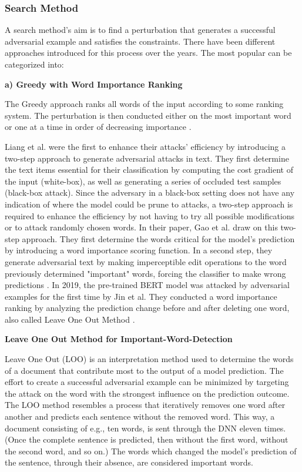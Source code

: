 \subsubsection{Search Method}
\label{sec:search_method}

A search method's aim is to find a perturbation that generates a successful adversarial example and satisfies the constraints. There have been different approaches introduced for this process over the years. The most popular can be categorized into:

    \textbf{a) Greedy with Word Importance Ranking}
    
        The Greedy approach ranks all words of the input according to some ranking system. The perturbation is then conducted either on the most important word or one at a time in order of decreasing importance \cite{li2018textbugger, jin2019bert, garg2020bae}.
    
        Liang et al. were the first to enhance their attacks' efficiency by introducing a two-step approach to generate adversarial attacks in text. They first determine the text items essential for their classification by computing the cost gradient of the input (white-box), as well as generating a series of occluded test samples (black-box attack)\cite{liang2017deep}. 
        Since the adversary in a black-box setting does not have any indication of where the model could be prune to attacks, a two-step approach is required to enhance the efficiency by not having to try all possible modifications or to attack randomly chosen words. 
        In their paper, Gao et al. draw on this two-step approach. They first determine the words critical for the model's prediction by introducing a word importance scoring function. In a second step, they generate adversarial text by making imperceptible edit operations to the word previously determined "important" words, forcing the classifier to make wrong predictions \cite{gao2018black}.
        In 2019, the pre-trained BERT model was attacked by adversarial examples for the first time by Jin et al. They conducted a word importance ranking by analyzing the prediction change before and after deleting one word, also called Leave One Out Method \cite{jin2019bert}.  
        
        \textbf{Leave One Out Method for Important-Word-Detection}
        

        Leave One Out (LOO) is an interpretation method used to determine the words of a document that contribute most to the output of a model prediction. The effort to create a successful adversarial example can be minimized by targeting the attack on the word with the strongest influence on the prediction outcome. The LOO method resembles a process that iteratively removes one word after another and predicts each sentence without the removed word. 
        This way, a document consisting of e.g., ten words, is sent through the DNN eleven times. (Once the complete sentence is predicted, then without the first word, without the second word, and so on.) The words which changed the model's prediction of the sentence, through their absence, are considered important words. 
        
